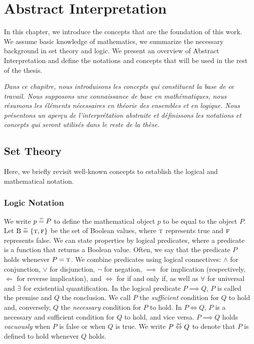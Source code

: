 


\setchapterpreamble[u]{\margintoc}


\chapter{Abstract Interpretation}



In this chapter, we introduce the concepts that are the foundation of this work.
We assume basic knowledge of mathematics, we summarize the necessary background in set theory and logic.
We present an overview of Abstract Interpretation and define the notations and concepts that will be used in the rest of the thesis.

\emph{Dans ce chapitre, nous introduisons les concepts qui constituent la base de ce travail. Nous supposons une connaissance de base en mathématiques, nous résumons les éléments nécessaires en théorie des ensembles et en logique. Nous présentons un aperçu de l'interprétation abstraite et définissons les notations et concepts qui seront utilisés dans le reste de la thèse.}

\section{Set Theory}

Here, we briefly revisit well-known concepts to establish the logical and mathematical notation.

\subsection{Logic Notation}

We write $p \defeq P$ to define the mathematical object $p$ to be equal to the object $P$.
Let $\B \defeq \{\true, \false\}$ be the set of Boolean values, where $\textsc{t}$ represents true and $\textsc{f}$ represents false.
We can state properties by logical predicates, where a predicate is a function that returns a Boolean value.
Often, we say that the predicate $P$ holds whenever $P = \textsc{t}$.
We combine predicates using logical connectives: $\land$ for conjunction, $\lor$ for disjunction, $\neg$ for negation, $\implies$ for implication (respectively, $\Leftarrow$ for reverse implication), and $\iff$ for if and only if, as well as $\forall$ for universal and $\exists$ for existential quantification.
In the logical predicate $P \implies Q$, $P$ is called the premise and $Q$ the conclusion.
We call $P$ the \emph{sufficient} condition for $Q$ to hold and, conversely, $Q$ the \emph{necessary} condition for $P$ to hold.
In $P \iff Q$, $P$ is a necessary and sufficient condition for $Q$ to hold, and vice versa.
$P \implies Q$ holds \emph{vacuously} when $P$ is false or when $Q$ is true.
We write $P \defiff Q$ to denote that $P$ is defined to hold whenever $Q$ holds.

